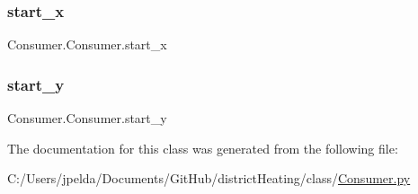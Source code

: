 \mbox{\label{class_consumer_1_1_consumer_a2b4e4c75066ac9e44f1c878608f5b8d6}} 
\subsubsection{\texorpdfstring{start\+\_\+x}{start\_x}}
{\footnotesize\ttfamily Consumer.\+Consumer.\+start\+\_\+x}

\mbox{\label{class_consumer_1_1_consumer_a3e90aa467f71be63160bfa466e1c9d2b}} 
\subsubsection{\texorpdfstring{start\+\_\+y}{start\_y}}
{\footnotesize\ttfamily Consumer.\+Consumer.\+start\+\_\+y}



The documentation for this class was generated from the following file\+:\begin{DoxyCompactItemize}
\item 
C\+:/\+Users/jpelda/\+Documents/\+Git\+Hub/district\+Heating/class/\hyperlink{_consumer_8py}{Consumer.\+py}\end{DoxyCompactItemize}
